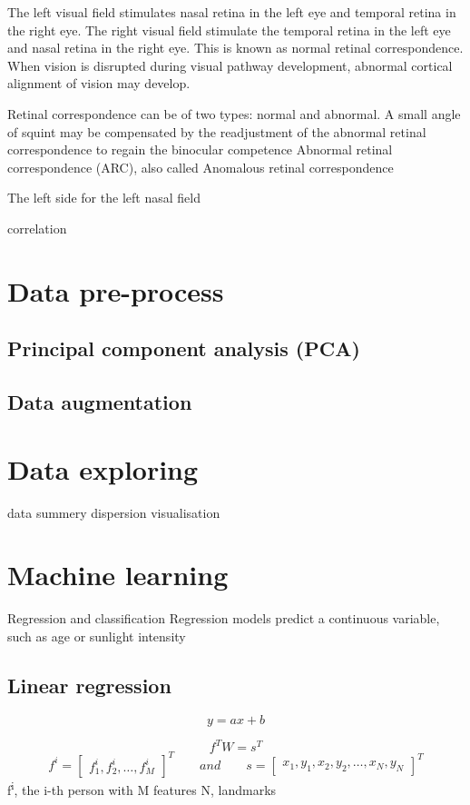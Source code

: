 \documentclass[12pt]{article}
\begin{document}
The left visual field stimulates nasal retina in the left eye and temporal retina in the right eye. The right visual field stimulate the temporal retina in the left eye and nasal retina in the right eye.
This is known as normal retinal correspondence.
When vision is disrupted during visual pathway development, abnormal cortical alignment of vision may develop.

Retinal correspondence can be of two types: normal and abnormal.
A small angle of squint may be compensated by the readjustment of the abnormal retinal correspondence to regain the binocular competence 
Abnormal retinal correspondence (ARC), also called Anomalous retinal correspondence

The left side for the 
left nasal field

\citep{Hussain2018}


correlation 
\section{Data pre-process}
\subsection{Principal component analysis (PCA)}
\subsection{Data augmentation}

\section{Data exploring}
 data summery
 dispersion
 visualisation
\section{Machine learning}
Regression and classification
Regression models predict a continuous variable, such as age or sunlight intensity
\subsection{Linear regression}
\[ y = ax + b \]


\[ f^TW = s^T\]
\[ f^i = \begin{bmatrix} f^i_1, f^i_2, \dots, f^i_M \end{bmatrix}^T \qquad and \qquad s = \begin{bmatrix} x_1, y_1, x_2, y_2, \dots, x_N, y_N \end{bmatrix}^T \]
\qquad\qquad f\textsuperscript{i}, the i-th person with M features \qquad\qquad N, landmarks
\end{document}
